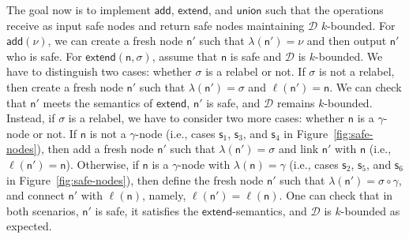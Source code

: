 \documentclass[
a4paper
]{article}
\theoremstyle{plain}
\theoremstyle{definition}
\theoremstyle{remark}
\newcommand{\D}{\mathcal{D}}
\newcommand{\n}{\textsf{n}}
\newcommand{\s}{\textsf{s}}
\newcommand{\dadd}{\operatorname{add}}
\newcommand{\dunion}{\operatorname{union}}
\newcommand{\dextend}{\operatorname{extend}}
\renewcommand{\operatorname}[1]{\textsf{#1}}
\begin{document}
The goal now is to implement $\dadd$, $\dextend$, and $\dunion$ such that the operations receive as input safe nodes and return safe nodes maintaining $\D$ $k$-bounded. For $\dadd(\nu)$, we can create a fresh node $\n'$ such that $\lambda(\n') = \nu$ and then output $\n'$ who is safe. For $\dextend(\n, \sigma)$, assume that $\n$ is safe and $\D$ is $k$-bounded. We have to distinguish two cases: whether $\sigma$ is a relabel or not. If $\sigma$ is not a relabel, then create a fresh node $\n'$ such that $\lambda(\n') = \sigma$ and $\ell(\n') = \n$. We can check that $\n'$ meets the semantics of $\dextend$, $\n'$ is safe, and $\D$ remains $k$-bounded. Instead, if $\sigma$ is a relabel, we have to consider two more cases: whether $\n$ is a $\gamma$-node or not. If $\n$ is not a $\gamma$-node (i.e., cases $\s_1$, $\s_3$, and $\s_4$ in Figure~\ref{fig:safe-nodes}), then add a fresh node $\n'$ such that $\lambda(\n') = \sigma$ and link $\n'$ with $\n$ (i.e., $\ell(\n') = \n$). Otherwise, if $\n$ is a $\gamma$-node with $\lambda(\n) = \gamma$ (i.e., cases $\s_2$, $\s_5$, and $\s_6$ in Figure~\ref{fig:safe-nodes}), then define the fresh node $\n'$ such that $\lambda(\n') = \sigma \circ \gamma$, and connect $\n'$ with $\ell(\n)$, namely, $\ell(\n') = \ell(\n)$. One can check that in both scenarios, $\n'$ is safe, it satisfies the $\dextend$-semantics, and $\D$ is $k$-bounded as expected.
\end{document}
